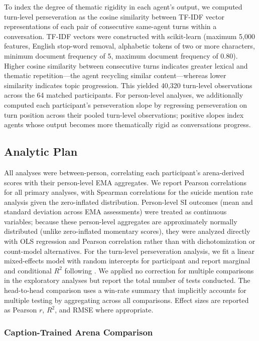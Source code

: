 \documentclass[review,12pt,authoryear]{elsarticle}
\begin{document}
To index the degree of thematic rigidity in each agent's output, we computed turn-level perseveration as the cosine similarity between TF-IDF vector representations of each pair of consecutive same-agent turns within a conversation. TF-IDF vectors were constructed with scikit-learn (maximum 5,000 features, English stop-word removal, alphabetic tokens of two or more characters, minimum document frequency of 5, maximum document frequency of 0.80). Higher cosine similarity between consecutive turns indicates greater lexical and thematic repetition---the agent recycling similar content---whereas lower similarity indicates topic progression. This yielded 40,320 turn-level observations across the 64 matched participants. For person-level analyses, we additionally computed each participant's perseveration slope by regressing perseveration on turn position across their pooled turn-level observations; positive slopes index agents whose output becomes more thematically rigid as conversations progress.

\subsection{Analytic Plan}

All analyses were between-person, correlating each participant's arena-derived scores with their person-level EMA aggregates. We report Pearson correlations for all primary analyses, with Spearman correlations for the suicide mention rate analysis given the zero-inflated distribution. Person-level SI outcomes (mean and standard deviation across EMA assessments) were treated as continuous variables; because these person-level aggregates are approximately normally distributed (unlike zero-inflated momentary scores), they were analyzed directly with OLS regression and Pearson correlation rather than with dichotomization or count-model alternatives. For the turn-level perseveration analysis, we fit a linear mixed-effects model with random intercepts for participant and report marginal and conditional $R^2$ following \citet{nakagawa2013general}. We applied no correction for multiple comparisons in the exploratory analyses but report the total number of tests conducted. The head-to-head comparison uses a win-rate summary that implicitly accounts for multiple testing by aggregating across all comparisons. Effect sizes are reported as Pearson $r$, $R^2$, and RMSE where appropriate.


\subsubsection{Caption-Trained Arena Comparison}
 
\end{document}
